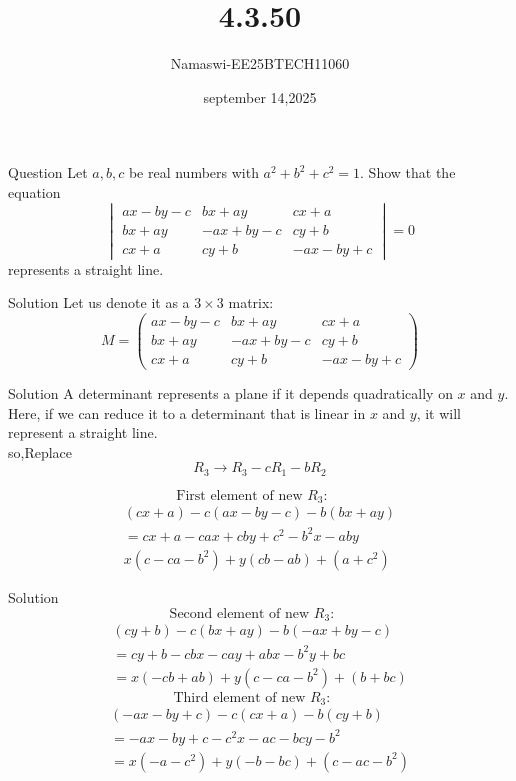 \documentclass{beamer}
\begin{document}
\title 
{4.3.50}
\date{september 14,2025}


\author 
{Namaswi-EE25BTECH11060}
\frame{\titlepage}
\begin{frame}{Question}
Let $a, b, c$ be real numbers with $a^2 + b^2 + c^2 = 1$. Show that the equation
\[
\begin{vmatrix}
ax - by - c & bx + ay & cx + a \\
bx + ay & -ax + by - c & cy + b \\
cx + a & cy + b & -ax - by + c
\end{vmatrix} = 0
\]
represents a straight line.
\end{frame}
\begin{frame}{Solution}
Let us denote it as a $3 \times 3$ matrix:
\[
M = 
\begin{pmatrix}
ax - by - c & bx + ay & cx + a \\
bx + ay & -ax + by - c & cy + b \\
cx + a & cy + b & -ax - by + c
\end{pmatrix}
\]  
\end{frame}
\begin{frame}{Solution}
A determinant represents a plane if it depends quadratically on $x$ and $y$. Here, if we can reduce it to a determinant that is linear in $x$ and $y$, it will represent a straight line.\\
so,Replace
\[
R_3 \rightarrow R_3 - c R_1 - b R_2
\]

\[
\text{First element of new } R_3: \quad
\]
\begin{align}
(cx + a) - c(ax - by - c) - b(bx + ay)\\
= cx + a - cax + cby + c^2 - b^2 x - a b y\\
x(c - ca - b^2) + y(cb - ab) + (a + c^2)
\end{align}  
\end{frame}
\begin{frame}{Solution}
\[
\text{Second element of new } R_3: \quad
\]
\begin{align}
(cy + b) - c(bx + ay) - b(-ax + by - c) \\
= cy + b - cbx - cay + abx - b^2 y + bc \\
= x(-cb + ab) + y(c - ca - b^2) + (b + bc)
\end{align}
 \[
\text{Third element of new } R_3: \quad
\]
\begin{align}
(-ax - by + c) - c(cx + a) - b(cy + b) \\
= -ax - by + c - c^2 x - ac - bcy - b^2 \\
= x(-a - c^2) + y(-b - bc) + (c - ac - b^2)
\end{align}  
\end{frame}
\end{document}
